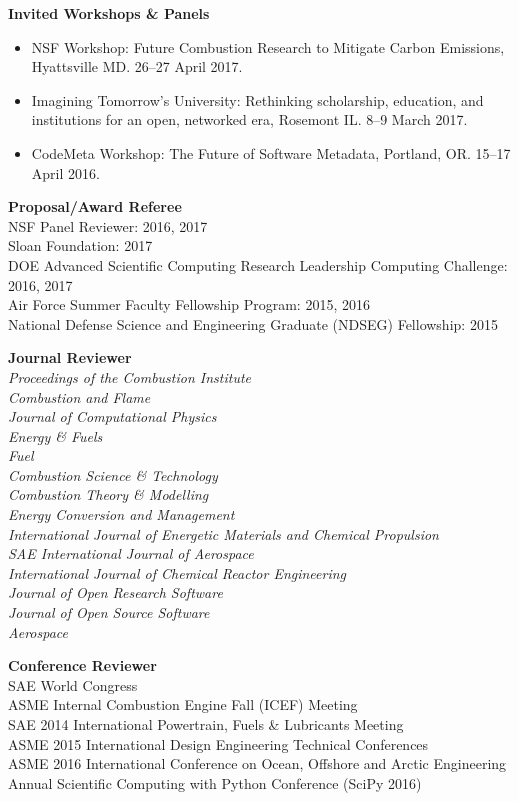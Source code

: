 \documentclass[margin,line,11pt]{res}
\begin{document}
\begin{resume}
\textbf{Invited Workshops \& Panels}
\begin{itemize}[leftmargin=*]
    \item NSF Workshop: Future Combustion Research to Mitigate Carbon Emissions, Hyattsville MD. 26--27 April 2017.
    \item Imagining Tomorrow's University: Rethinking scholarship, education, and institutions for an open, networked era, Rosemont IL. 8--9 March 2017.
    \item CodeMeta Workshop: The Future of Software Metadata, Portland, OR. 15--17 April 2016.
\end{itemize}

\textbf{Proposal\slash Award Referee} \\
NSF Panel Reviewer: 2016, 2017 \\
Sloan Foundation: 2017 \\
DOE Advanced Scientific Computing Research Leadership Computing Challenge: 2016, 2017 \\
Air Force Summer Faculty Fellowship Program: 2015, 2016 \\
National Defense Science and Engineering Graduate (NDSEG) Fellowship: 2015

\textbf{Journal Reviewer} \\
\emph{Proceedings of the Combustion Institute}\\
\emph{Combustion and Flame}\\
\emph{Journal of Computational Physics}\\
\emph{Energy \& Fuels}\\
\emph{Fuel}\\
\emph{Combustion Science \& Technology}\\
\emph{Combustion Theory \& Modelling}\\
\emph{Energy Conversion and Management}\\
\emph{International Journal of Energetic Materials and Chemical Propulsion}\\
\emph{SAE International Journal of Aerospace}\\
\emph{International Journal of Chemical Reactor Engineering} \\
\emph{Journal of Open Research Software} \\
\emph{Journal of Open Source Software} \\
\emph{Aerospace}

\textbf{Conference Reviewer} \\
SAE World Congress\\
ASME Internal Combustion Engine Fall (ICEF) Meeting\\
SAE 2014 International Powertrain, Fuels \& Lubricants Meeting \\
ASME 2015 International Design Engineering Technical Conferences \\
ASME 2016  International Conference on Ocean, Offshore and Arctic Engineering \\
 Annual Scientific Computing with Python Conference (SciPy 2016)


\end{resume}
\end{document}
